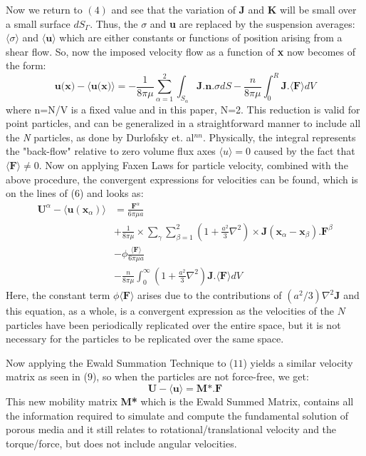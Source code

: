 \documentclass[12pt]{article}
\begin{document}
Now we return to $(4)$ and see that the variation of \textbf{J} and \textbf{K} will be small over a small surface $dS_{\Gamma}$.  Thus, the \textbf{$\sigma$} and \textbf{u} are replaced by the suspension averages: $\langle \sigma \rangle$ and $\langle \textbf{u} \rangle$ which are either constants or functions of position arising from a shear flow. So, now the imposed velocity flow as a function of \textbf{x} now becomes of the form:
\begin{equation}
\label{eq10}
\textbf{u(x)}-\langle \textbf{u(x)} \rangle = -\frac{1}{8 \pi \mu} \sum_{\alpha=1}^{2} \int_{S_\alpha} \textbf{J.n}.\sigma dS - \frac{n}{8 \pi \mu} \int_{0}^{R} \textbf{J}.\langle \textbf{F} \rangle dV 
\end{equation}
where n=N/V is a fixed value and in this paper, N=2. This reduction is valid for point particles, and can be generalized in a straightforward manner to include all the \textit{N} particles, as done by Durlofsky et. al$^{nn}$. Physically, the integral represents the "back-flow" relative to zero volume flux axes $\langle u \rangle = 0$ caused by the fact that $\langle \textbf{F} \rangle \neq 0$. Now on applying Faxen Laws for particle velocity, combined with the above procedure, the convergent expressions for velocities can be found, which is on the lines of ($6$) and looks as:
\begin{equation}
\label{eq11}
\begin{split}
\textbf{U}^{\alpha}- \langle \textbf{u}(\textbf{x}_\alpha) \rangle &=  \frac{\textbf{F}^{\alpha}}{6 \pi \mu a}\\
&+\frac{1}{8 \pi \mu} \times \sum_{\gamma} \sum_{\beta=1}^{2} \left(1+\frac{a^2}{3} \nabla^2 \right) \times \textbf{J}(\textbf{x}_{\alpha} - \textbf{x}_{\beta}).\textbf{F}^{\beta} \\
& - \phi\frac{\langle \textbf{F} \rangle}{6 \pi \mu a} \\
&-\frac{n}{8 \pi \mu} \int_{0}^{\infty} \left(1+\frac{a^2}{3} \nabla^2 \right) \textbf{J}.\langle \textbf{F} \rangle dV
\end{split}
\end{equation}
Here, the constant term $\phi \langle \textbf{F} \rangle$ arises due to the contributions of $(a^2 / 3)\nabla^2 \textbf{J}$ and this equation, as a whole, is a convergent expression as the velocities of the $N$ particles have been periodically replicated over the entire space, but it is not necessary for the particles to be replicated over the same space. 

Now applying the Ewald Summation Technique to ($11$) yields a similar velocity matrix as seen in ($9$), so when the particles are not force-free, we get:
\begin{equation}
\label{eq12}
\textbf{U}-\langle \textbf{u} \rangle = \textbf{M*.F}
\end{equation}
This new mobility matrix \textbf{M*} which is the Ewald Summed Matrix, contains all the information required to simulate and compute the fundamental solution of porous media and it still relates to rotational/translational velocity and the torque/force, but does not include angular velocities. 
\end{document}
